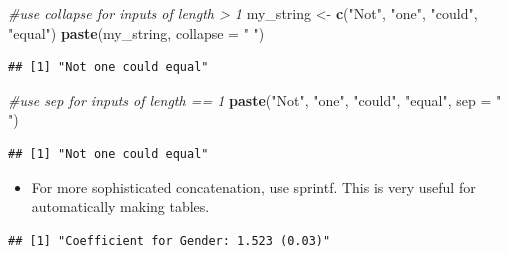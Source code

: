 \documentclass[]{book}
\newenvironment{Shaded}{\begin{snugshade}}{\end{snugshade}}
\newcommand{\KeywordTok}[1]{\textcolor[rgb]{0.13,0.29,0.53}{\textbf{#1}}}
\newcommand{\DataTypeTok}[1]{\textcolor[rgb]{0.13,0.29,0.53}{#1}}
\newcommand{\FloatTok}[1]{\textcolor[rgb]{0.00,0.00,0.81}{#1}}
\newcommand{\StringTok}[1]{\textcolor[rgb]{0.31,0.60,0.02}{#1}}
\newcommand{\CommentTok}[1]{\textcolor[rgb]{0.56,0.35,0.01}{\textit{#1}}}
\newcommand{\NormalTok}[1]{#1}
\providecommand{\tightlist}{%
  \setlength{\itemsep}{0pt}\setlength{\parskip}{0pt}}
\theoremstyle{definition}
\theoremstyle{definition}
\theoremstyle{definition}
\theoremstyle{remark}
\begin{document}
\begin{Shaded}
\begin{Highlighting}[]
\CommentTok{#use collapse for inputs of length > 1 }
\NormalTok{my_string <-}\StringTok{ }\KeywordTok{c}\NormalTok{(}\StringTok{"Not"}\NormalTok{, }\StringTok{"one"}\NormalTok{, }\StringTok{"could"}\NormalTok{, }\StringTok{"equal"}\NormalTok{)}
\KeywordTok{paste}\NormalTok{(my_string, }\DataTypeTok{collapse =} \StringTok{" "}\NormalTok{)}
\end{Highlighting}
\end{Shaded}

\begin{verbatim}
## [1] "Not one could equal"
\end{verbatim}

\begin{Shaded}
\begin{Highlighting}[]
\CommentTok{#use sep for inputs of length == 1 }
\KeywordTok{paste}\NormalTok{(}\StringTok{"Not"}\NormalTok{, }\StringTok{"one"}\NormalTok{, }\StringTok{"could"}\NormalTok{, }\StringTok{"equal"}\NormalTok{, }\DataTypeTok{sep =} \StringTok{" "}\NormalTok{)}
\end{Highlighting}
\end{Shaded}

\begin{verbatim}
## [1] "Not one could equal"
\end{verbatim}

\begin{itemize}
\tightlist
\item
  For more sophisticated concatenation, use sprintf. This is very useful
  for automatically making tables.
\end{itemize}

\begin{Shaded}
\end{Shaded}

\begin{verbatim}
## [1] "Coefficient for Gender: 1.523 (0.03)"
\end{verbatim}

\begin{Shaded}
\begin{Highlighting}[]
\CommentTok{#%
\CommentTok{#%
\CommentTok{#%
\end{Highlighting}
\end{Shaded}
\end{document}
